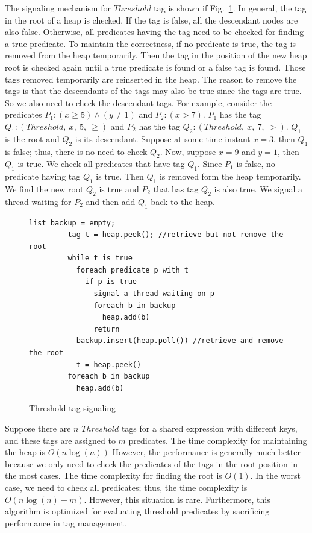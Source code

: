 \documentclass{sigplanconf}
\begin{document}
The signaling mechanism for $Threshold$ tag is shown if Fig.~\ref{fig:th_sig}. In
general, the tag in the root of a heap is checked. If the tag is false, all the
descendant nodes are also false. Otherwise, all predicates having the tag
need to be checked for finding a true predicate. To maintain the correctness, 
if no predicate is true, the tag is removed from the heap temporarily. Then the
tag in the position of the new heap root is checked again until a true predicate is found or a
false tag is found. Those tags removed temporarily are reinserted in the heap.
The reason to remove the tags is that the descendants of the tags may also be
true since the tags are true. So we also need to check the descendant tags. For
example, consider the predicates $P_1: (x \ge 5) \wedge (y \ne 1)$ and 
$P_2: (x > 7)$. $P_1$ has the tag $Q_1: (Threshold,\ x,\ 5,\ \ge)$ and $P_2$
has the tag $Q_2: (Threshold,\ x,\ 7,\ >)$. $Q_1$ is the root and $Q_2$ is its
descendant. Suppose at some time instant $x=3$, then $Q_1$ is false; thus, there is no
need to check $Q_2$. Now, suppose $x = 9$ and $y = 1$, then $Q_1$ is true. We
check all predicates that have tag $Q_1$.  Since $P_1$ is false, no predicate
having tag $Q_1$ is true. Then $Q_1$ is removed form the heap temporarily. We find the
new root $Q_2$ is true and $P_2$ that has tag $Q_2$ is also true. We signal 
a thread waiting for $P_2$ and then add $Q_1$ back to the heap. 

\begin{figure}[ht!]
    \begin{Verbatim}[fontsize=\footnotesize,gobble=8,frame=lines,
            framesep=3mm]
         list backup = empty;
         tag t = heap.peek(); //retrieve but not remove the root 
         while t is true
           foreach predicate p with t
             if p is true
               signal a thread waiting on p
               foreach b in backup 
                 heap.add(b)
               return 
           backup.insert(heap.poll()) //retrieve and remove the root 
           t = heap.peek()
         foreach b in backup 
           heap.add(b)
    \end{Verbatim}
  \caption{Threshold tag signaling}
  \label{fig:th_sig}
\end{figure}


Suppose there are $n$ $Threshold$ tags for a shared expression with different 
keys, and these tags are assigned to $m$ predicates. The time 
complexity for maintaining the heap is $O(n \log(n))$ 
However, the performance is generally much better because we only
need to check the predicates of the tags in the root position in the most
cases. The time complexity for finding the root is $O(1)$. In the worst case, 
we need to check all predicates; thus, the time complexity is $O(n \log(n) + m)$. 
However, this situation is rare. Furthermore, this algorithm is optimized for
evaluating threshold predicates by sacrificing performance in tag management.  
\end{document}
